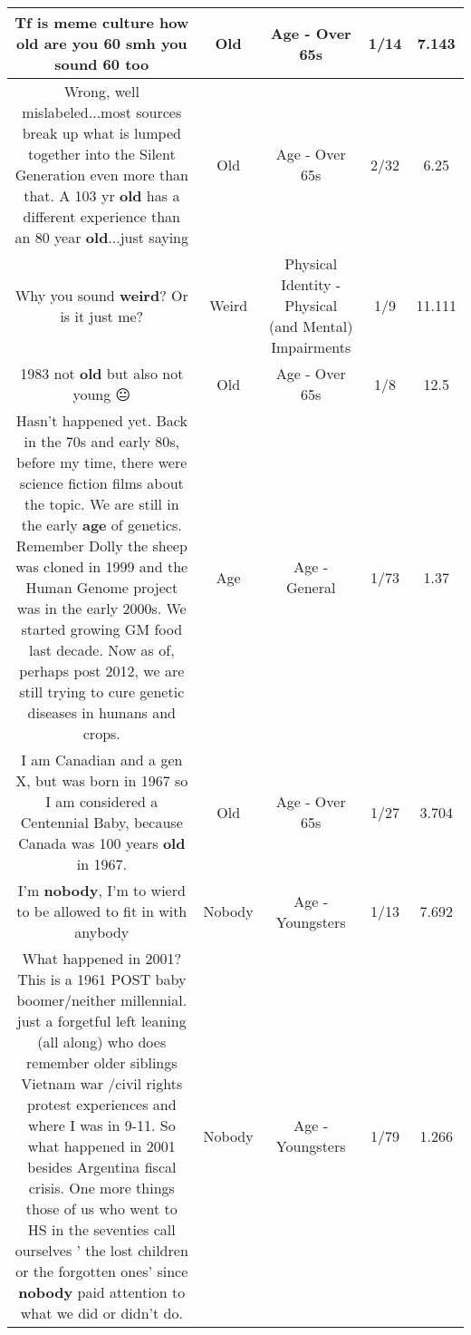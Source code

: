 \documentclass[11pt]{article}
\newlength\mylength
\begin{document}
\begin{center}
\begin{longtable}{|C{.65\mylength}|C{.30\mylength}|C{.12\mylength}|C{.12\mylength}|C{.12\mylength}|}
  \small Tf is meme culture how \textbf{old} are you 60 smh you sound 60 too\normalsize   & Old & Age - Over 65s & 1/14 & 7.143 \\  \hline
  \small Wrong, well mislabeled...most sources break up what is lumped together into the Silent Generation even more than that. A 103 yr \textbf{old} has a different experience than an 80 year \textbf{old}...just saying\normalsize   & Old & Age - Over 65s & 2/32 & 6.25 \\  \hline
  \small Why you sound \textbf{weird}? Or is it just me?\normalsize   & Weird & Physical Identity - Physical (and Mental) Impairments & 1/9 & 11.111 \\  \hline
  \small 1983 not \textbf{old} but also not young 😐\normalsize   & Old & Age - Over 65s & 1/8 & 12.5 \\  \hline
  \small Hasn't happened yet. Back in the 70s and early 80s, before my time, there were science fiction films about the topic. We are still in the early \textbf{age} of genetics. Remember Dolly the sheep was cloned in 1999 and the Human Genome project was in the early 2000s. We started growing GM food last decade. Now as of, perhaps post 2012, we are still trying to cure genetic diseases in humans and crops.\normalsize   & Age & Age - General & 1/73 & 1.37 \\  \hline
  \small I am Canadian and a gen X, but was born in 1967 so I am considered a Centennial Baby, because Canada was 100 years \textbf{old} in 1967.\normalsize   & Old & Age - Over 65s & 1/27 & 3.704 \\  \hline
  \small I'm \textbf{nobody}, I'm to wierd to be allowed to fit in with anybody\normalsize   & Nobody & Age - Youngsters & 1/13 & 7.692 \\  \hline
  \small What happened in 2001? This is a 1961 POST baby boomer/neither millennial. just a forgetful left leaning (all along) who does remember older siblings Vietnam war /civil rights protest experiences and where I was in 9-11.  So what happened in 2001 besides Argentina fiscal crisis. One more things those of us who went to HS in the seventies call ourselves ' the lost children or the forgotten ones' since \textbf{nobody} paid attention to what we did or didn't do.\normalsize   & Nobody & Age - Youngsters & 1/79 & 1.266 \\  \hline

\end{longtable}
\end{center}
\end{document}
